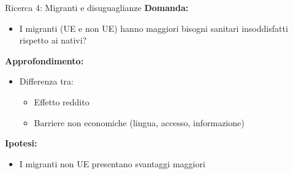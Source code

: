 \documentclass{beamer}
\begin{document}
	\begin{frame}{Ricerca 4: Migranti e disuguaglianze}
		\textbf{Domanda:}
		\begin{itemize}
			\item I migranti (UE e non UE) hanno maggiori bisogni sanitari insoddisfatti rispetto ai nativi?
		\end{itemize}
		
		\vspace{0.3cm}
		\textbf{Approfondimento:}
		\begin{itemize}
			\item Differenza tra:
			\begin{itemize}
				\item Effetto reddito
				\item Barriere non economiche (lingua, accesso, informazione)
			\end{itemize}
		\end{itemize}
		
		\vspace{0.3cm}
		\textbf{Ipotesi:}
		\begin{itemize}
			\item I migranti non UE presentano svantaggi maggiori
		\end{itemize}
	\end{frame}
	
\end{document}
